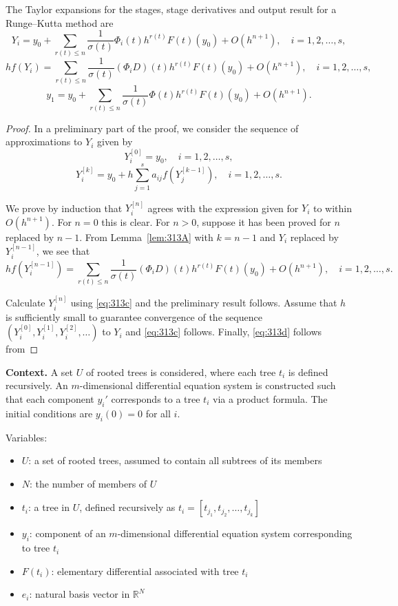 \begin{theorem}

  \label{thm:313B}
The Taylor expansions for the stages, stage derivatives and output result for a Runge--Kutta method are
\[
Y_i = y_0 + \sum_{r(t) \leq n} \frac{1}{\sigma(t)} \Phi_i(t) h^{r(t)} F(t)(y_0) + O(h^{n+1}), \quad i = 1, 2, \dots, s, \tag{313c}
\]
\[
h f(Y_i) = \sum_{r(t) \leq n} \frac{1}{\sigma(t)} (\Phi_i D)(t) h^{r(t)} F(t)(y_0) + O(h^{n+1}), \quad i = 1, 2, \dots, s, \tag{313d}
\]
\[
y_1 = y_0 + \sum_{r(t) \leq n} \frac{1}{\sigma(t)} \Phi(t) h^{r(t)} F(t)(y_0) + O(h^{n+1}). \tag{313e}
\]
\end{theorem}

\begin{proof}
In a preliminary part of the proof, we consider the sequence of approximations to $Y_i$ given by
\[
Y_i^{[0]} = y_0, \quad i = 1, 2, \dots, s, \tag{313f}
\]
\[
Y_i^{[k]} = y_0 + h \sum_{j=1}^{s} a_{ij} f\left( Y_j^{[k-1]} \right), \quad i = 1, 2, \dots, s. \tag{313g}
\]

We prove by induction that $Y_i^{[n]}$ agrees with the expression given for $Y_i$ to within $O(h^{n+1})$. For $n = 0$ this is clear. For $n > 0$, suppose it has been proved for $n$ replaced by $n - 1$. From Lemma~\ref{lem:313A} with $k = n - 1$ and $Y_i$ replaced by $Y_i^{[n-1]}$, we see that
\[
h f\left( Y_i^{[n-1]} \right) = \sum_{r(t) \leq n} \frac{1}{\sigma(t)} (\Phi_i D)(t) h^{r(t)} F(t)(y_0) + O(h^{n+1}), \quad i = 1, 2, \dots, s.
\]

Calculate $Y_i^{[n]}$ using \eqref{eq:313c} and the preliminary result follows. Assume that $h$ is sufficiently small to guarantee convergence of the sequence $(Y_i^{[0]}, Y_i^{[1]}, Y_i^{[2]}, \dots)$ to $Y_i$ and \eqref{eq:313c} follows. Finally, \eqref{eq:313d} follows from
\end{proof}

\noindent\textbf{Context.}
A set $U$ of rooted trees is considered, where each tree $t_i$ is defined recursively. An $m$-dimensional differential equation system is constructed such that each component $y_i'$ corresponds to a tree $t_i$ via a product formula. The initial conditions are $y_i(0)=0$ for all $i$.

Variables:
\begin{itemize}
    \item $U$: a set of rooted trees, assumed to contain all subtrees of its members
    \item $N$: the number of members of $U$
    \item $t_i$: a tree in $U$, defined recursively as $t_i = [t_{j_1}, t_{j_2}, \dots, t_{j_k}]$
    \item $y_i$: component of an $m$-dimensional differential equation system corresponding to tree $t_i$
    \item $F(t_i)$: elementary differential associated with tree $t_i$
    \item $e_i$: natural basis vector in $\mathbb{R}^N$
\end{itemize}

